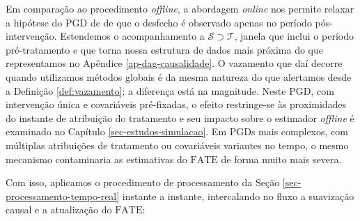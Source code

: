 Em comparação ao procedimento \emph{offline}, a abordagem \emph{online} nos permite relaxar a hipótese do PGD de  de que o desfecho é observado apenas no período pós-intervenção. 
Estendemos o acompanhamento a \(\mathcal{S} \supset \mathcal{T}\), janela que inclui o período pré-tratamento e que torna nossa estrutura de dados mais próxima do que representamos no Apêndice \ref{ap-dag-causalidade}. 
O vazamento que daí decorre quando utilizamos métodos globais é da mesma natureza do que alertamos desde a Definição \ref{def:vazamento}; a diferença está na magnitude. 
Neste PGD, com intervenção única e covariáveis pré-fixadas, o efeito restringe-se às proximidades do instante de atribuição do tratamento e seu impacto sobre o estimador \emph{offline} é examinado no Capítulo \ref{sec-estudos-simulacao}. 
Em PGDs mais complexos, com múltiplas atribuições de tratamento ou covariáveis variantes no tempo, o mesmo mecanismo contaminaria as estimativas do \(\mathrm{FATE}\) de forma muito mais severa.

Com isso, aplicamos o procedimento de processamento da Seção \ref{sec-processamento-tempo-real} instante a instante, intercalando no fluxo a suavização causal e a atualização do \(\mathrm{FATE}\):

